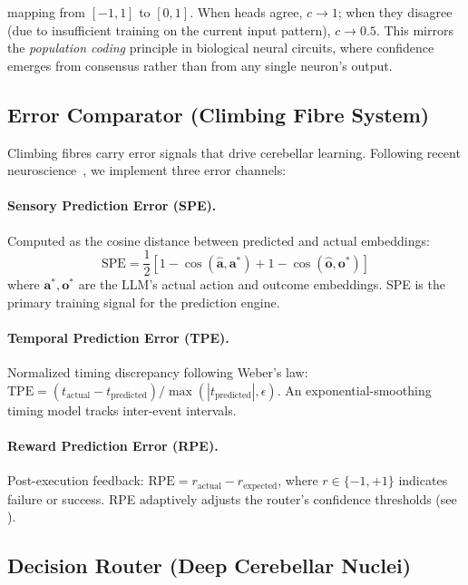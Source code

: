 \documentclass[11pt,a4paper]{article}
\DeclareMathOperator{\cosim}{cos}
\begin{document}
mapping from $[-1, 1]$ to $[0, 1]$.
When heads agree, $c \to 1$; when they disagree (due to insufficient training on the current input pattern), $c \to 0.5$.
This mirrors the \emph{population coding} principle in biological neural circuits, where confidence emerges from consensus rather than from any single neuron's output.

\subsection{Error Comparator (Climbing Fibre System)}\label{sec:error}

Climbing fibres carry error signals that drive cerebellar learning.
Following recent neuroscience~\citep{tsay2025cerebellum}, we implement three error channels:

\paragraph{Sensory Prediction Error (SPE).}
Computed as the cosine distance between predicted and actual embeddings:
\begin{equation}
  \text{SPE} = \frac{1}{2}\left[
    1 - \cosim(\hat{\mathbf{a}}, \mathbf{a}^*) +
    1 - \cosim(\hat{\mathbf{o}}, \mathbf{o}^*)
  \right]
\end{equation}
where $\mathbf{a}^*, \mathbf{o}^*$ are the LLM's actual action and outcome embeddings.
SPE is the primary training signal for the prediction engine.

\paragraph{Temporal Prediction Error (TPE).}
Normalized timing discrepancy following Weber's law:
$\text{TPE} = (t_{\text{actual}} - t_{\text{predicted}}) / \max(|t_{\text{predicted}}|, \epsilon)$.
An exponential-smoothing timing model tracks inter-event intervals.

\paragraph{Reward Prediction Error (RPE).}
Post-execution feedback: $\text{RPE} = r_{\text{actual}} - r_{\text{expected}}$,
where $r \in \{-1, +1\}$ indicates failure or success.
RPE adaptively adjusts the router's confidence thresholds (see ).

\subsection{Decision Router (Deep Cerebellar Nuclei)}\label{sec:router}
\end{document}
